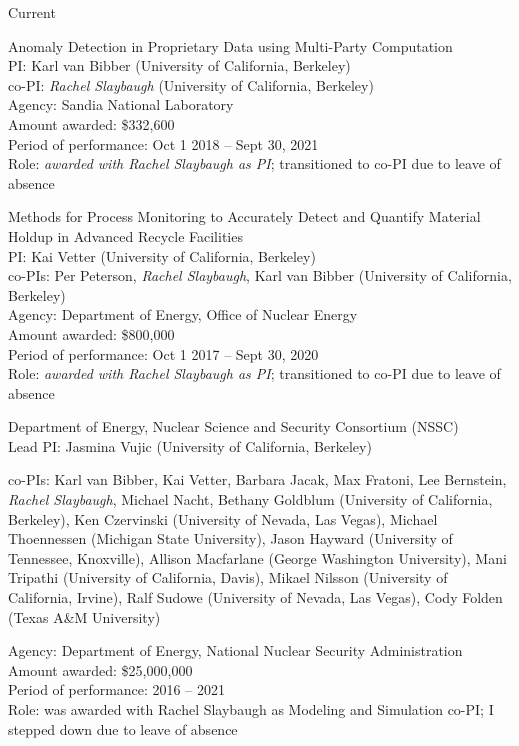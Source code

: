 \begin{rSubsection}{Current}{}{}{}
\item Anomaly Detection in Proprietary Data using Multi-Party Computation	\\
PI: Karl van Bibber (University of California, Berkeley) \\
\hspace*{1 em} co-PI: \textit{Rachel Slaybaugh} (University of California, Berkeley)\\
Agency: Sandia National Laboratory \\
Amount awarded: \$332,600\\
Period of performance: Oct 1 2018 -- Sept 30, 2021\\
Role: \textit{awarded with Rachel Slaybaugh as PI}; transitioned to co-PI due to leave of absence

\vspace*{0.3 em}
\item Methods for Process Monitoring to Accurately Detect and Quantify Material Holdup in Advanced Recycle Facilities	\\
PI: Kai Vetter (University of California, Berkeley) \\
\hspace*{1 em} co-PIs:  Per Peterson, \textit{Rachel Slaybaugh}, Karl van Bibber (University of California, Berkeley)\\
Agency: Department of Energy, Office of Nuclear Energy \\
Amount awarded: \$800,000\\
Period of performance: Oct 1 2017 -- Sept 30, 2020\\
Role: \textit{awarded with Rachel Slaybaugh as PI}; transitioned to co-PI due to leave of absence

\vspace*{0.3 em}
\item Department of Energy, Nuclear Science and Security Consortium (NSSC)\\
Lead PI: Jasmina Vujic (University of California, Berkeley)
\vspace*{-.6 em}
\begin{addmargin}[1em]{0 em}
co-PIs: Karl van Bibber, Kai Vetter, Barbara Jacak, Max Fratoni, Lee Bernstein, \textit{Rachel Slaybaugh}, Michael Nacht, Bethany Goldblum (University of California, Berkeley), Ken Czervinski (University of Nevada, Las Vegas), Michael Thoennessen (Michigan State University), Jason Hayward (University of Tennessee, Knoxville), Allison Macfarlane (George Washington University), Mani Tripathi (University of California, Davis), Mikael Nilsson (University of California, Irvine), Ralf Sudowe (University of Nevada, Las Vegas), Cody Folden (Texas A\&M University)
\end{addmargin}
\vspace*{-.6 em}
Agency:  Department of Energy, National Nuclear Security Administration\\
Amount awarded: \$25,000,000\\
Period of performance: 2016 -- 2021\\
Role: was awarded with Rachel Slaybaugh as Modeling and Simulation co-PI; I stepped down due to leave of absence
\end{rSubsection}

